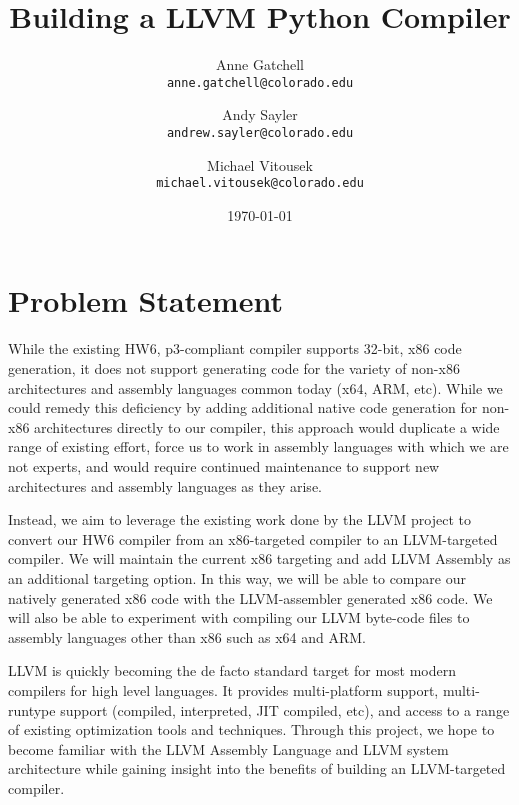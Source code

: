 \documentclass[11pt]{article}
\begin{document}
\title{
  Building a LLVM Python Compiler
}

\author{
  Anne Gatchell    \\ \texttt{anne.gatchell@colorado.edu} \and
  Andy Sayler      \\ \texttt{andrew.sayler@colorado.edu} \and
  Michael Vitousek \\ \texttt{michael.vitousek@colorado.edu}
}

\date{\today}

\maketitle

\section{Problem Statement}

While the existing HW6, p3-compliant compiler supports 32-bit,
x86 code generation, it does not support generating code for the variety
of non-x86 architectures and assembly languages common today (x64, ARM,
etc). While we could remedy
this deficiency by adding additional native code generation for non-x86
architectures directly to our compiler, this approach would duplicate a
wide range of existing effort, force us to work in assembly languages
with which we are not experts, and would require continued maintenance to
support new architectures and assembly languages as they arise.

Instead, we aim to leverage the existing work done by the LLVM project
\cite{llvm.org} to
convert our HW6 compiler from an x86-targeted compiler to
an LLVM-targeted compiler. We will maintain the current x86 targeting
and add LLVM Assembly\cite{lattner-llvmlangref}
as an additional targeting option. In
this way, we will be able to compare our natively generated x86 code
with the LLVM-assembler generated x86 code. We will also be able to
experiment with compiling our LLVM byte-code files to assembly
languages other than x86 such as x64 and ARM.

LLVM is quickly becoming the de facto standard target for most modern
compilers for high level languages.
It provides multi-platform support, multi-runtype support
(compiled, interpreted, JIT compiled, etc), and access to a
range of existing optimization tools and techniques. Through this
project, we hope to become
familiar with the LLVM Assembly Language and LLVM system architecture
while gaining insight into the benefits of building an LLVM-targeted
compiler. 
\end{document}
